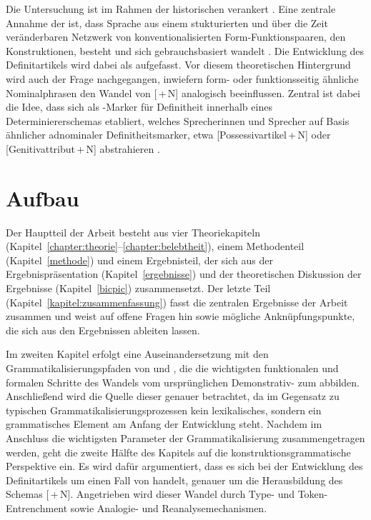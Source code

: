 Die Untersuchung ist im Rahmen der historischen  verankert \parencite[s. u.a.][]{Traugott2003,Bergs2008,Traugott2013}. Eine zentrale Annahme der  ist, dass Sprache aus einem stukturierten und über die Zeit veränderbaren Netzwerk von konventionalisierten Form-Funktionspaaren, den Konstruktionen,  besteht und sich gebrauchsbasiert  wandelt \parencite{Bybee2010,Bybee2013}. Die Entwicklung des Definitartikels  wird dabei als  aufgefasst. Vor diesem theoretischen Hintergrund wird auch der Frage nachgegangen, inwiefern form- oder funktionsseitig ähnliche Nominalphrasen  den Wandel von [\,+\,N] analogisch  beeinflussen. Zentral ist dabei die Idee, dass sich  als -Marker für Definitheit innerhalb eines Determiniererschemas   etabliert, welches Sprecherinnen und Sprecher auf Basis ähnlicher adnominaler Definitheitsmarker, etwa  [Possessivartikel\,+\,N]   oder [Genitivattribut\,+\,N]  abstrahieren \parencite[vgl. für das Englische][]{Sommerer2015}.

\section{Aufbau} 

Der Hauptteil der Arbeit besteht aus vier Theoriekapiteln  (Kapitel~\ref{chapter:theorie}--\ref{chapter:belebtheit}), einem Methodenteil (Kapitel~\ref{methode}) und einem Ergebnisteil, der sich aus der Ergebnispräsentation (Kapitel~\ref{ergebnisse}) und der theoretischen Diskussion der Ergebnisse (Kapitel~\ref{bicpic}) zusammensetzt. Der letzte Teil (Kapitel~\ref{kapitel:zusammenfassung}) fasst die zentralen Ergebnisse der Arbeit zusammen und weist auf offene Fragen hin sowie mögliche Anknüpfungspunkte, die sich aus den Ergebnissen ableiten lassen. 

Im zweiten Kapitel erfolgt eine Auseinandersetzung mit den Grammatikalisierungspfaden  von \textcite{Greenberg1978} und \textcite{Lehmann2015}, die die wichtigsten funktionalen und formalen Schritte des Wandels vom ursprünglichen Demonstrativ-  zum  abbilden. Anschließend wird die Quelle dieser 
 genauer betrachtet, da im Gegensatz zu typischen Grammatikalisierungsprozessen  kein lexikalisches, sondern ein grammatisches Element am Anfang der Entwicklung steht. Nachdem im Anschluss die wichtigsten Parameter der Grammatikalisierung zusammengetragen werden, geht die zweite Hälfte des Kapitels auf die konstruktionsgrammatische Perspektive  ein. Es wird dafür argumentiert, dass es sich bei der Entwicklung des Definitartikels  um einen Fall von 
 handelt, genauer um die Herausbildung des Schemas  [\,+\,N]. Angetrieben wird dieser Wandel durch Type- und Token-Entrenchment   sowie Analogie- und Reanalysemechanismen.   

